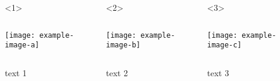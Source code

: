 \documentclass{beamer}
\begin{document}
\begin{frame}

\begin{columns}[onlytextwidth]
    \begin{column}{.15\textwidth}
    \end{column}
    \begin{onlyenv}<1>
        \begin{column}{.2\textwidth}
            \texttt{[image: example-image-a]}
        \end{column}
        \begin{column}{.6\textwidth}
            text 1
        \end{column}    
    \end{onlyenv}
    \begin{onlyenv}<2>
        \begin{column}{.2\textwidth}
            \texttt{[image: example-image-b]}
        \end{column}
        \begin{column}{.6\textwidth}
            text 2
        \end{column}    
    \end{onlyenv}   
    \begin{onlyenv}<3>
        \begin{column}{.2\textwidth}
            \texttt{[image: example-image-c]}
        \end{column}
        \begin{column}{.6\textwidth}
            text 3
        \end{column}    
    \end{onlyenv}
\end{columns}

\end{frame}
\end{document}
